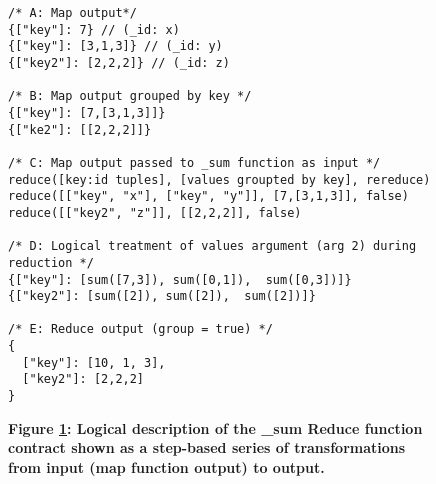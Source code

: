 \begin{figure}[H]
    \centering
    \begin{mdframed}[rightline=true,leftline=true]
        \begin{verbatim}
/* A: Map output*/
{["key"]: 7} // (_id: x)
{["key"]: [3,1,3]} // (_id: y)
{["key2"]: [2,2,2]} // (_id: z)

/* B: Map output grouped by key */
{["key"]: [7,[3,1,3]]}
{["ke2"]: [[2,2,2]]}

/* C: Map output passed to _sum function as input */
reduce([key:id tuples], [values groupted by key], rereduce)
reduce([["key", "x"], ["key", "y"]], [7,[3,1,3]], false)
reduce([["key2", "z"]], [[2,2,2]], false)

/* D: Logical treatment of values argument (arg 2) during reduction */
{["key"]: [sum([7,3]), sum([0,1]),  sum([0,3])]}
{["key2"]: [sum([2]), sum([2]),  sum([2])]}

/* E: Reduce output (group = true) */
{
  ["key"]: [10, 1, 3],
  ["key2"]: [2,2,2]
}
    \end{verbatim}
    \end{mdframed}
    \caption[\_sum Reduce Function Logic]{\textbf{Figure \ref{fig-sum-reduce-fn}: Logical description of the \_sum Reduce function contract shown as a step-based series of transformations from input (map function output) to output.}}
    \label{fig-sum-reduce-fn}
\end{figure}